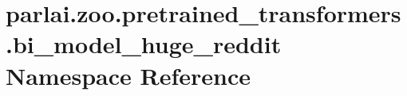 \hypertarget{namespaceparlai_1_1zoo_1_1pretrained__transformers_1_1bi__model__huge__reddit}{}\section{parlai.\+zoo.\+pretrained\+\_\+transformers.\+bi\+\_\+model\+\_\+huge\+\_\+reddit Namespace Reference}
\label{namespaceparlai_1_1zoo_1_1pretrained__transformers_1_1bi__model__huge__reddit}
